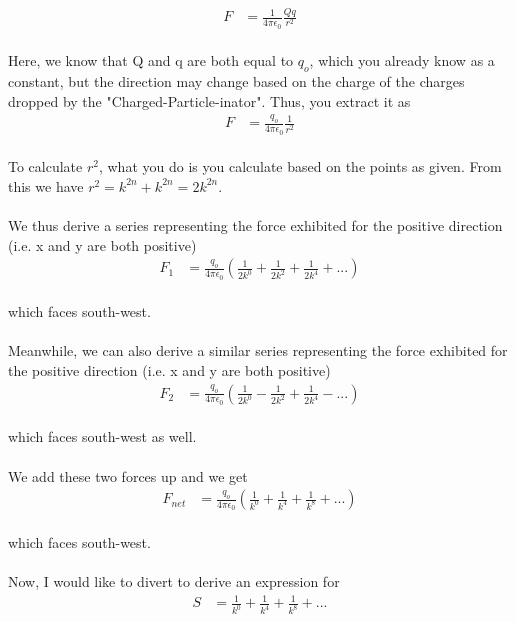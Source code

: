 \begin{align*}
F &= \frac{1}{4\pi\epsilon_0} \frac{Qq}{r^2}
\end{align*}
\\
Here, we know that Q and q are both equal to $q_o$, which you already know as a constant, but the direction may change based on the charge of the charges dropped by the "Charged-Particle-inator". Thus, you extract it as 
\\
\begin{align*}
F &= \frac{q_o}{4\pi\epsilon_0} \frac{1}{r^2}
\end{align*}
\\
To calculate $r^2$, what you do is you calculate based on the points as given. From this we have $r^2 = k^{2n} + k^{2n} = 2k^{2n}$.
\\\\
We thus derive a series representing the force exhibited for the positive direction (i.e. x and y are both positive) 
\\
\begin{align*}
F_1 &= \frac{q_o}{4\pi\epsilon_0}(\frac{1}{2k^0} + \frac{1}{2k^2} + \frac{1}{2k^4} + ...)
\end{align*}
\\
which faces south-west.
\\
\\
Meanwhile, we can also derive a similar series representing the force exhibited for the positive direction (i.e. x and y are both positive) 
\\
\begin{align*}
F_2 &= \frac{q_o}{4\pi\epsilon_0}(\frac{1}{2k^0} - \frac{1}{2k^2} + \frac{1}{2k^4} - ...) 
\end{align*}
\\
which faces south-west as well.
\\
\\
We add these two forces up and we get
\\
\begin{align*}
F_{net} &= \frac{q_o}{4\pi\epsilon_0}(\frac{1}{k^0} + \frac{1}{k^4} + \frac{1}{k^8} + ...)
\end{align*}
\\
 which faces south-west.
\\
\\
Now, I would like to divert to derive an expression for
\\
\begin{align*}
S &= \frac{1}{k^0} + \frac{1}{k^4} + \frac{1}{k^8} + ...
\end{align*}
